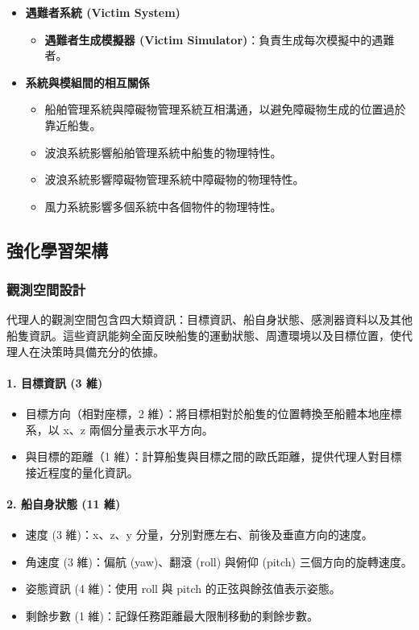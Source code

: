 \documentclass[12pt,a4paper]{article}
\begin{document}
\begin{itemize}
	 \item \textbf{遇難者系統 (Victim System)}
	\begin{itemize}
	    \item \textbf{遇難者生成模擬器 (Victim Simulator)}：負責生成每次模擬中的遇難者。
	\end{itemize}
	
	 \item \textbf{系統與模組間的相互關係}
	\begin{itemize}
	    \item 船舶管理系統與障礙物管理系統互相溝通，以避免障礙物生成的位置過於靠近船隻。
	    \item 波浪系統影響船舶管理系統中船隻的物理特性。
	    \item 波浪系統影響障礙物管理系統中障礙物的物理特性。
	    \item 風力系統影響多個系統中各個物件的物理特性。
	\end{itemize}

\end{itemize}

\subsection{強化學習架構}

\subsubsection{觀測空間設計}
代理人的觀測空間包含四大類資訊：目標資訊、船自身狀態、感測器資料以及其他船隻資訊。這些資訊能夠全面反映船隻的運動狀態、周遭環境以及目標位置，使代理人在決策時具備充分的依據。

\paragraph{1. 目標資訊 (3 維)}
\begin{itemize}
    \item 目標方向（相對座標，2 維）：將目標相對於船隻的位置轉換至船體本地座標系，以 x、z 兩個分量表示水平方向。
    \item 與目標的距離（1 維）：計算船隻與目標之間的歐氏距離，提供代理人對目標接近程度的量化資訊。
\end{itemize}

\paragraph{2. 船自身狀態 (11 維)}
\begin{itemize}
    \item 速度 (3 維)：x、z、y 分量，分別對應左右、前後及垂直方向的速度。
    \item 角速度 (3 維)：偏航 (yaw)、翻滾 (roll) 與俯仰 (pitch) 三個方向的旋轉速度。
    \item 姿態資訊 (4 維)：使用 roll 與 pitch 的正弦與餘弦值表示姿態。
    \item 剩餘步數 (1 維)：記錄任務距離最大限制移動的剩餘步數。
\end{itemize}
\end{document}
